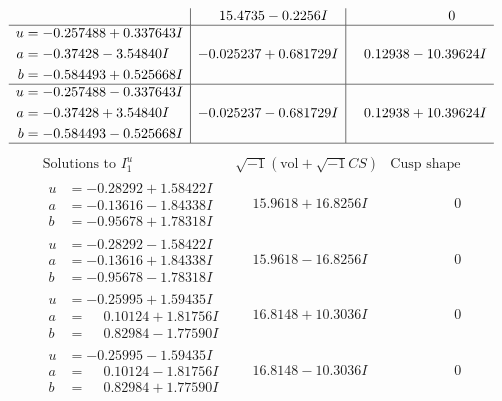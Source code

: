 \documentclass[1p]{elsarticle_modified}
\theoremstyle{definition}
\newcommand{\I}{\sqrt{-1}}
\begin{document}
$$\begin{array}{c|c|c}
 & \phantom{-}15.4735 - 0.2256 I & \phantom{-0.000000 } 0 \\ \hline\begin{aligned}
u &= -0.257488 + 0.337643 I \\
a &= -0.37428 - 3.54840 I \\
b &= -0.584493 + 0.525668 I\end{aligned}
 & -0.025237 + 0.681729 I & \phantom{-}0.12938 - 10.39624 I \\ \hline\begin{aligned}
u &= -0.257488 - 0.337643 I \\
a &= -0.37428 + 3.54840 I \\
b &= -0.584493 - 0.525668 I\end{aligned}
 & -0.025237 - 0.681729 I & \phantom{-}0.12938 + 10.39624 I\\
 \hline 
 \end{array}$$\newpage$$\begin{array}{c|c|c}  
\text{Solutions to }I^u_{1}& \I (\text{vol} + \sqrt{-1}CS) & \text{Cusp shape}\\
 \hline 
\begin{aligned}
u &= -0.28292 + 1.58422 I \\
a &= -0.13616 - 1.84338 I \\
b &= -0.95678 + 1.78318 I\end{aligned}
 & \phantom{-}15.9618 + 16.8256 I & \phantom{-0.000000 } 0 \\ \hline\begin{aligned}
u &= -0.28292 - 1.58422 I \\
a &= -0.13616 + 1.84338 I \\
b &= -0.95678 - 1.78318 I\end{aligned}
 & \phantom{-}15.9618 - 16.8256 I & \phantom{-0.000000 } 0 \\ \hline\begin{aligned}
u &= -0.25995 + 1.59435 I \\
a &= \phantom{-}0.10124 + 1.81756 I \\
b &= \phantom{-}0.82984 - 1.77590 I\end{aligned}
 & \phantom{-}16.8148 + 10.3036 I & \phantom{-0.000000 } 0 \\ \hline\begin{aligned}
u &= -0.25995 - 1.59435 I \\
a &= \phantom{-}0.10124 - 1.81756 I \\
b &= \phantom{-}0.82984 + 1.77590 I\end{aligned}
 & \phantom{-}16.8148 - 10.3036 I & \phantom{-0.000000 } 0 \\ \hline\begin{aligned}

\end{aligned}
\end{array}$$
\end{document}
